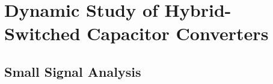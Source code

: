 \chapter[Dynamic Study]{Dynamic Study of Hybrid-Switched Capacitor Converters}
\section{Small Signal Analysis}


